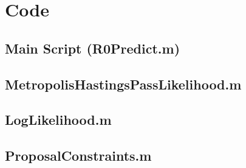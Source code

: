 \documentclass{X:/Documents/Coding/Latex/myreport}
\begin{document}
\clearpage
\appendix

\printbibliography
\section{Code}
\subsection{Main Script (R0Predict.m)}


\subsection{MetropolisHastingsPassLikelihood.m}

\subsection{LogLikelihood.m}

\subsection{ProposalConstraints.m}





\end{document}
